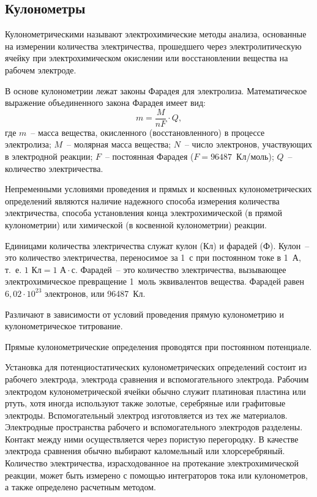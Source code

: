 \documentclass[pscyr]{hedwork}
\begin{document}
  \subsection{Кулонометры}

  Кулонометрическими называют электрохимические методы анализа, основанные на
  измерении количества электричества, прошедшего через электролитическую ячейку
  при электрохимическом окислении или восстановлении вещества на рабочем
  электроде.

  В основе кулонометрии лежат законы Фарадея для электролиза. Математическое
  выражение объединенного закона Фарадея имеет вид:
  \[
    m = \frac{M}{nF}\cdot Q,
  \]
  где \( m \)~-- масса вещества, окисленного (восстановленного) в процессе
  электролиза; \( M \)~-- молярная масса вещества; \( N \)~-- число электронов,
  участвующих в электродной реакции; \( F \)~-- постоянная Фарадея
  (\( F = 96487 \)~Кл/моль); \( Q \)~-- количество электричества.

  Непременными условиями проведения и прямых и косвенных кулонометрических
  определений являются наличие надежного способа измерения количества
  электричества, способа установления конца электрохимической (в прямой
  кулонометрии) или химической (в косвенной кулонометрии) реакции.

  Единицами количества электричества служат кулон (Кл) и фарадей (Ф). Кулон~--
  это количество электричества, переносимое за 1~с при постоянном токе в 1~А,
  т.~е. \( 1\text{ Кл} = 1 \text{ А}\cdot\text{с} \). Фарадей~-- это количество
  электричества, вызывающее электрохимическое превращение 1~моль эквивалентов
  вещества. Фарадей равен \( 6,\!02\cdot10^{23} \) электронов, или 96487~Кл.

  Различают в зависимости от условий проведения прямую кулонометрию и
  кулонометрическое титрование.

  Прямые кулонометрические определения проводятся при постоянном потенциале.

  Установка для потенциостатических кулонометрических определений состоит из
  рабочего электрода, электрода сравнения и вспомогательного электрода. Рабочим
  электродом кулонометрической ячейки обычно служит платиновая пластина или
  ртуть, хотя иногда используют также золотые, серебряные или графитовые
  электроды. Вспомогательный электрод изготовляется из тех же материалов.
  Электродные пространства рабочего и вспомогательного электродов разделены.
  Контакт между ними осуществляется через пористую перегородку. В качестве
  электрода сравнения обычно выбирают каломельный или хлорсеребряный. Количество
  электричества, израсходованное на протекание электрохимической реакции, может
  быть измерено с помощью интеграторов тока или кулонометров, а также определено
  расчетным методом.
\end{document}
